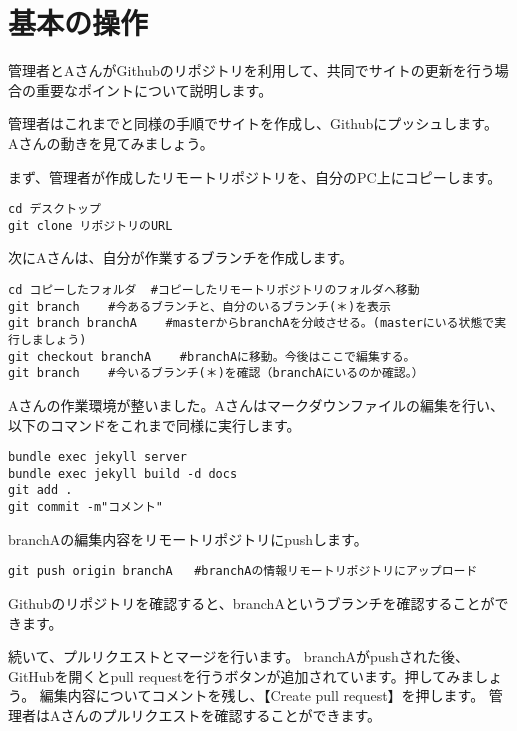\documentclass[
]{book}
\begin{document}
\hypertarget{ux57faux672cux306eux64cdux4f5c}{%
\section{基本の操作}\label{ux57faux672cux306eux64cdux4f5c}}

管理者とAさんがGithubのリポジトリを利用して、共同でサイトの更新を行う場合の重要なポイントについて説明します。

管理者はこれまでと同様の手順でサイトを作成し、Githubにプッシュします。
Aさんの動きを見てみましょう。

まず、管理者が作成したリモートリポジトリを、自分のPC上にコピーします。

\begin{verbatim}
cd デスクトップ
git clone リポジトリのURL
\end{verbatim}

次にAさんは、自分が作業するブランチを作成します。

\begin{verbatim}
cd コピーしたフォルダ  #コピーしたリモートリポジトリのフォルダへ移動
git branch    #今あるブランチと、自分のいるブランチ(＊)を表示
git branch branchA    #masterからbranchAを分岐させる。(masterにいる状態で実行しましょう)
git checkout branchA    #branchAに移動。今後はここで編集する。
git branch    #今いるブランチ(＊)を確認（branchAにいるのか確認。）
\end{verbatim}

Aさんの作業環境が整いました。Aさんはマークダウンファイルの編集を行い、以下のコマンドをこれまで同様に実行します。

\begin{verbatim}
bundle exec jekyll server
bundle exec jekyll build -d docs
git add .
git commit -m"コメント"
\end{verbatim}

branchAの編集内容をリモートリポジトリにpushします。

\begin{verbatim}
git push origin branchA   #branchAの情報リモートリポジトリにアップロード
\end{verbatim}

Githubのリポジトリを確認すると、branchAというブランチを確認することができます。

続いて、プルリクエストとマージを行います。
branchAがpushされた後、GitHubを開くとpull requestを行うボタンが追加されています。押してみましょう。
編集内容についてコメントを残し、【Create pull request】を押します。
管理者はAさんのプルリクエストを確認することができます。
\end{document}
